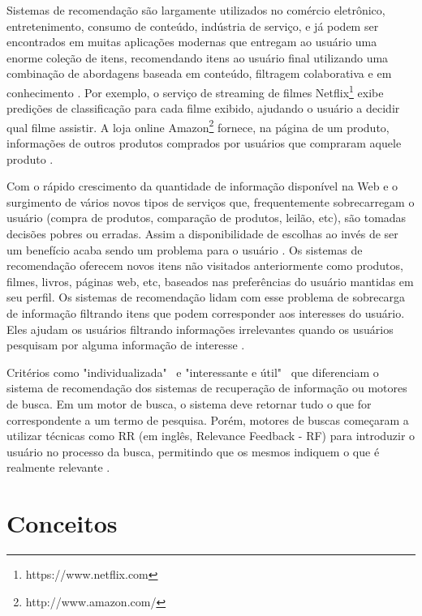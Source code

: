 Sistemas de recomendação são largamente utilizados no comércio eletrônico, entretenimento, consumo de conteúdo, indústria de serviço, e já podem ser encontrados em muitas aplicações modernas que entregam ao usuário uma enorme coleção de itens, recomendando itens ao usuário final utilizando uma combinação de abordagens baseada em conteúdo, filtragem colaborativa e em conhecimento \citep{ricci2011recommender}. Por exemplo, o serviço de streaming de filmes Netflix\footnote{https://www.netflix.com} exibe predições de classificação para cada filme exibido, ajudando o usuário a decidir qual filme assistir. A loja online Amazon\footnote{http://www.amazon.com/} fornece, na página de um produto, informações de outros produtos comprados por usuários que compraram aquele produto \citep{shani2009evaluatingrecommender}.

Com o rápido crescimento da quantidade de informação disponível na Web e o surgimento de vários novos tipos de serviços que, frequentemente sobrecarregam o usuário (compra de produtos, comparação de produtos, leilão, etc), são tomadas decisões pobres ou erradas. Assim a disponibilidade de escolhas ao invés de ser um benefício acaba sendo um problema para o usuário \citep{ricci2011recommender}. Os sistemas de recomendação oferecem novos itens não visitados anteriormente como produtos, filmes, livros, páginas web, etc, baseados nas preferências do usuário mantidas em seu perfil. Os sistemas de recomendação lidam com esse problema de sobrecarga de informação filtrando itens que podem corresponder aos interesses do usuário. Eles ajudam os usuários filtrando informações irrelevantes quando os usuários pesquisam por alguma informação de interesse \citep{DBLP:journals/corr/abs-1109-0166}.

Critérios como "individualizada"~ e "interessante e útil"~ que diferenciam o sistema de recomendação dos sistemas de recuperação de informação ou motores de busca. Em um motor de busca, o sistema deve retornar tudo o que for correspondente a um termo de pesquisa. Porém, motores de buscas começaram a utilizar técnicas como \ac{RR} (em inglês, Relevance Feedback - RF) para introduzir o usuário no processo da busca, permitindo que os mesmos indiquem o que é realmente relevante \citep{Burke:2002:HRS:586321.586352}.

\section{Conceitos}
\label{sec:conceitosSistemaRecomendacao}

